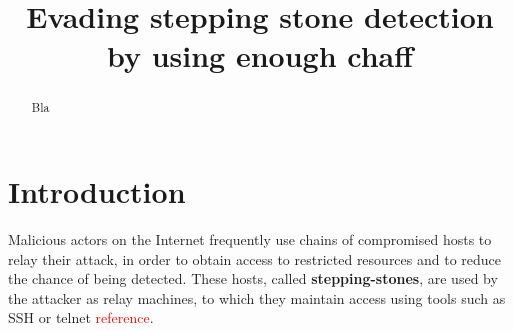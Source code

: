 \documentclass[conference]{IEEEtran}\usepackage[]{graphicx}\usepackage[]{color}
\begin{document}
\title{Evading stepping stone detection by using enough chaff}


\author{
\and
{}
\and
{}
}


\IEEEoverridecommandlockouts
\makeatletter{}\makeatother
{}


\maketitle          

\begin{abstract}

Bla
\end{abstract}



\section{Introduction}



Malicious actors on the Internet frequently use chains of compromised hosts to relay their attack, in order to obtain access to restricted resources and to reduce the chance of being detected. These hosts, called \textbf{stepping-stones}, are used by the attacker as relay machines, to which they maintain access using tools such as SSH or telnet \textcolor{red}{reference}. 
\end{document}
